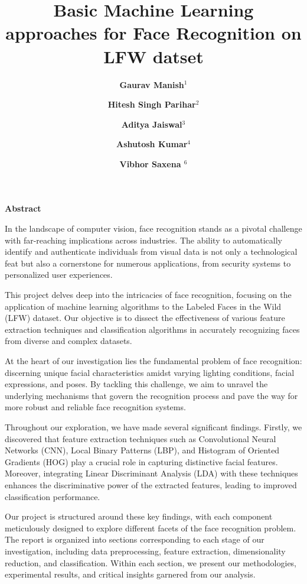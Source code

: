 \documentclass[a4paper]{article}
\title{\bfseries \huge Basic Machine Learning approaches for Face Recognition on LFW datset}
\author{\bfseries \Large Gaurav Manish$^1$\and \bfseries \Large Hitesh Singh Parihar$^2$ \and \bfseries \Large Aditya Jaiswal$^3$\and \bfseries \Large Ashutosh Kumar$^4$\and \bfseries \Large Vibhor Saxena $^6$}
\date{ \bfseries \Large
	$^1$Indian Institute Of Technology,Jodhpur \\ \textbf{\{  b22cs079 , b22ee0089 , b22cs025 , b22cs015,c23cs1005\}@iitj.ac.in}\\%
	\texttt
}
\theoremstyle{plain}
\theoremstyle{definition}
\renewenvironment{abstract}
 {\Large\textbf{Abstract}\vspace{0.5em}\par\noindent\ignorespaces}
 {\par\vspace{0.5em}}
\begin{document}
	\maketitle
	
	\begin  {abstract}
 \fontsize{15}{15}\selectfont 
 In the landscape of computer vision, face recognition stands as a pivotal challenge with far-reaching implications across industries. The ability to automatically identify and authenticate individuals from visual data is not only a technological feat but also a cornerstone for numerous applications, from security systems to personalized user experiences.\vspace{8pt}

This project delves deep into the intricacies of face recognition, focusing on the application of machine learning algorithms to the Labeled Faces in the Wild (LFW) dataset. Our objective is to dissect the effectiveness of various feature extraction techniques and classification algorithms in accurately recognizing faces from diverse and complex datasets.\vspace{8pt}

At the heart of our investigation lies the fundamental problem of face recognition: discerning unique facial characteristics amidst varying lighting conditions, facial expressions, and poses. By tackling this challenge, we aim to unravel the underlying mechanisms that govern the recognition process and pave the way for more robust and reliable face recognition systems.\vspace{8pt}

Throughout our exploration, we have made several significant findings. Firstly, we discovered that feature extraction techniques such as Convolutional Neural Networks (CNN), Local Binary Patterns (LBP), and Histogram of Oriented Gradients (HOG) play a crucial role in capturing distinctive facial features. Moreover, integrating Linear Discriminant Analysis (LDA) with these techniques enhances the discriminative power of the extracted features, leading to improved classification performance.\vspace{8pt}

Our project is structured around these key findings, with each component meticulously designed to explore different facets of the face recognition problem. The report is organized into sections corresponding to each stage of our investigation, including data preprocessing, feature extraction, dimensionality reduction, and classification. Within each section, we present our methodologies, experimental results, and critical insights garnered from our analysis.\vspace{8pt}


\end{abstract}
\end{document}
